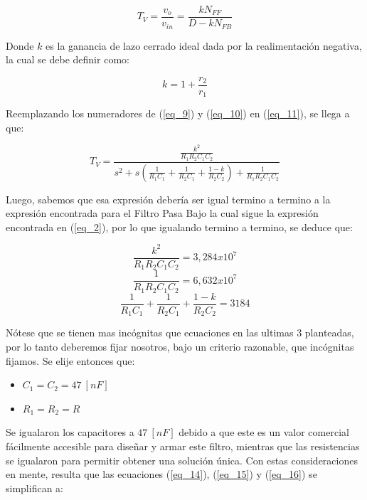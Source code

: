 \documentclass[12pt,a4paper]{article}
\begin{document}
\begin{equation}
    \label{eq_11}
    T_V = \frac{v_{o}}{v_{in}} = \frac{k N_{FF}}{D - kN_{FB}}
\end{equation}

Donde $k$ es la ganancia de lazo cerrado ideal dada por la realimentación negativa, la cual se debe definir como: 

\begin{equation}
    \label{eq_12}
    k = 1 + \frac{r_{2}}{r_{1}}
\end{equation}

Reemplazando los numeradores de (\ref{eq_9}) y (\ref{eq_10}) en (\ref{eq_11}), se llega a que:

\begin{equation}
    \label{eq_13}
    T_V = \frac{\frac{k^2}{R_{1}R_{2}C_{1}C_{2}}}{s^2 + s\left(\frac{1}{R_{1}C_{1}} + \frac{1}{R_{2}C_{1}} + \frac{1-k}{R_{2}C_{2}}\right) + \frac{1}{R_{1}R_{2}C_{1}C_{2}}}
\end{equation}

Luego, sabemos que esa expresión debería ser igual termino a termino a la expresión encontrada para el Filtro Pasa Bajo la cual sigue la expresión encontrada en (\ref{eq_2}), por lo que igualando termino a termino, se deduce que:

\begin{equation}
    \label{eq_14}
    \frac{k^2}{R_{1}R_{2}C_{1}C_{2}} = 3,284x10^{7}
\end{equation}
\begin{equation}
    \label{eq_15}
    \frac{1}{R_{1}R_{2}C_{1}C_{2}} = 6,632x10^{7}
\end{equation}
\begin{equation}
    \label{eq_16}
    \frac{1}{R_{1}C_{1}} + \frac{1}{R_{2}C_{1}} + \frac{1-k}{R_{2}C_{2}} = 3184
\end{equation}

Nótese que se tienen mas incógnitas que ecuaciones en las ultimas 3 planteadas, por lo tanto deberemos fijar nosotros, bajo un criterio razonable, que incógnitas fijamos. Se elije entonces que:

\begin{itemize}
    \item $C_{1} = C_{2} = 47 \ [nF]$
    \item $R_{1} = R_{2} = R$ 
\end{itemize}

Se igualaron los capacitores a $47 \ [nF]$ debido a que este es un valor comercial fácilmente accesible para diseñar y armar este filtro, mientras que las resistencias se igualaron para permitir obtener una solución única. Con estas consideraciones en mente, resulta que las ecuaciones (\ref{eq_14}), (\ref{eq_15}) y (\ref{eq_16}) se simplifican a:
\end{document}
